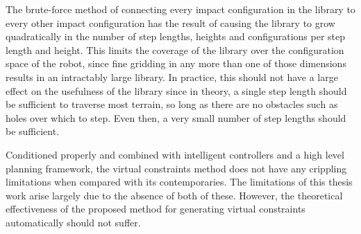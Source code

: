 The brute-force method of connecting every impact configuration in the library to every other impact configuration has the result of causing the library to grow quadratically in the number of step lengths, heights and configurations per step length and height. This limits the coverage of the library over the configuration space of the robot, since fine gridding in any more than one of those dimensions results in an intractably large library. In practice, this should not have a large effect on the usefulness of the library since in theory, a single step length should be sufficient to traverse most terrain, so long as there are no obstacles such as holes over which to step. Even then, a very small number of step lengths should be sufficient.

Conditioned properly and combined with intelligent controllers and a high level planning framework, the virtual constraints method does not have any crippling limitations when compared with its contemporaries. The limitations of this thesis work arise largely due to the absence of both of these. However, the theoretical effectiveness of the proposed method for generating virtual constraints automatically should not suffer.